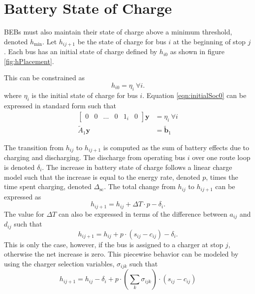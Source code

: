 \section{Battery State of Charge}
BEBs must also maintain their state of charge above a minimum threshold, denoted $h_{\text{min}}$. Let $h_{ij+1}$ be the state of charge for bus $i$ at the beginning of stop $j$. Each bus has an initial state of charge defined by $h_{i0}$ as shown in figure \ref{fig:hPlacement}. 

This can be constrained as
\begin{equation}\label{eqn:initialSoc0}
	h_{i0} = \eta_{i} \ \forall i.
\end{equation}
where $\eta_{i}$ is the initial state of charge for bus $i$.
Equation \ref{eqn:initialSoc0} can be expressed in standard form such that
\begin{equation} \begin{aligned}
	\begin{bmatrix}0 & 0 & \hdots & 0 & 1_i& 0 \end{bmatrix}\mathbf{y} &= \eta_i \ \forall i \\
		\tilde{A}_1\mathbf{y} &= \tilde{\mathbf{b}}_1
\end{aligned} \end{equation}

\par The transition from $h_{ij}$ to $h_{ij+1}$ is computed as the sum of battery effects due to charging and discharging. The discharge from operating bus $i$ over one route loop is denoted $\delta_i$. The increase in battery state of charge follows a linear charge model such that the increase is equal to the energy rate, denoted $p$, times the time spent charging, denoted $\Delta_{\text{sc}}$.
The total change from $h_{ij}$ to $h_{ij+1}$ can be expressed as
\begin{equation}
	h_{ij+1} = h_{ij} + \Delta T\cdot p - \delta_i.
\end{equation}
The value for $\Delta T$ can also be expressed in terms of the difference between $a_{ij}$ and $d_{ij}$ such that
\begin{equation}
	h_{ij+1} = h_{ij} + p\cdot \left ( s_{ij} - c_{ij} \right ) - \delta_i.
\end{equation}
This is only the case, however, if the bus is assigned to a charger at stop $j$, otherwise the net increase is zero. This piecewise behavior can be modeled by using the charger selection variables, $\sigma_{ijk}$ such that
\begin{equation}\label{eqn:bilinear}
	h_{ij+1} = h_{ij} - \delta_i + p\cdot\left(\sum_k\sigma_{ijk}\right )\cdot(s_{ij} - c_{ij}) 
\end{equation}

